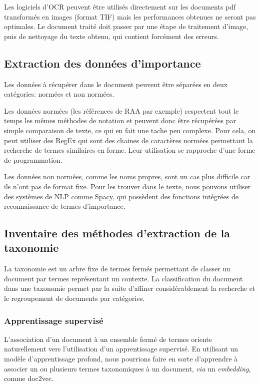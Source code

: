 Les logiciels d'OCR peuvent être utilisés directement sur les documents pdf transformés en images (format TIF) mais les performances obtenues ne seront pas optimales.
Le document traité doit passer par une étape de traitement d'image, puis de nettoyage du texte obtenu, qui contient forcément des erreurs.

\subsection{Extraction des données d'importance}
Les données à récupérer dans le document peuvent être séparées en deux catégories: normées et non normées.

Les données normées (les références de RAA par exemple) respectent tout le temps les mêmes méthodes de notation et peuvent donc être récupérées par simple comparaison de texte, ce qui en fait une tache peu complexe.
Pour cela, on peut utiliser des RegEx qui sont des chaines de caractères normées permettant la recherche de termes similaires en forme.
Leur utilisation se rapproche d'une forme de programmation.

Les données non normées, comme les noms propres, sont un cas plus difficile car ils n'ont pas de format fixe.
Pour les trouver dans le texte, nous pouvons utiliser des systèmes de \gls{NLP} comme Spacy, qui possèdent des fonctions intégrées de reconnaissance de termes d'importance.


\subsection{Inventaire des méthodes d'extraction de la taxonomie}
La taxonomie est un arbre fixe de termes fermés permettant de classer un document par termes représentant un contexte.
La classification du document dans une taxonomie permet par la suite d'affiner considérablement la recherche et le regroupement de documents par catégories.

\subsubsection{Apprentissage supervisé}
L'association d'un document à un ensemble fermé de termes oriente naturellement vers l'utilisation d'un apprentissage supervisé.
En utilisant un modèle d'apprentissage profond, nous pourrions faire en sorte d'apprendre à associer un ou plusieurs termes taxonomiques à un document, \textit{via} un \textit{embedding}, comme doc2vec\cite{doc2vec}.

